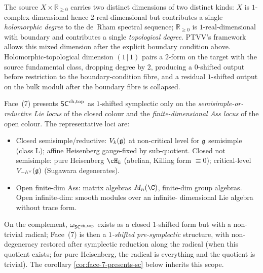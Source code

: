 \begin{remark}
\label{rem:why-pair-21}%
The source $X\times\mathbb{R}_{\geq 0}$ carries two distinct
dimensions of two distinct kinds:
$X$ is $1$-complex-dimensional hence $2$-real-dimensional but
contributes a single \emph{holomorphic degree} to the de~Rham
spectral sequence; $\mathbb{R}_{\geq 0}$ is $1$-real-dimensional
with boundary and contributes a single \emph{topological degree}.
PTVV's framework allows this mixed dimension after the explicit
boundary condition above. Holomorphic-topological dimension
$(1\,|\,1)$ pairs a $2$-form on the target with the source
fundamental class, dropping degree by $2$, producing a
$0$-shifted output before restriction to the boundary-condition
fibre, and a residual $1$-shifted output on the bulk moduli after
the boundary fibre is collapsed.
\end{remark}

\begin{remark}
\label{rem:face-7-scope}%
%
Face~(7) presents $\mathsf{SC}^{\mathrm{ch},\mathrm{top}}$ as $1$-shifted symplectic only on the
\emph{semisimple-or-reductive Lie locus} of the closed colour and
the \emph{finite-dimensional Ass locus} of the open colour. The
representative loci are:
\begin{itemize}
\item Closed semisimple/reductive: $V_k(\mathfrak{g})$ at non-critical level
for $\mathfrak{g}$ semisimple (class L); affine Heisenberg gauge-fixed by
sub-quotient. Closed not semisimple: pure Heisenberg
$\cH_k$ (abelian, Killing form $\equiv 0$); critical-level
$V_{-h^\vee}(\mathfrak{g})$ (Sugawara degenerates).
\item Open finite-dim Ass: matrix algebras $M_n(\C)$, finite-dim
group algebras. Open infinite-dim: smooth modules over an infinite-
dimensional Lie algebra without trace form.
\end{itemize}
On the complement, $\omega_{\mathsf{SC}^{\mathrm{ch},\mathrm{top}}}$ exists as a closed
$1$-shifted form but with a non-trivial radical; Face~(7) is then a
\emph{$1$-shifted pre-symplectic} structure, with non-degeneracy
restored after symplectic reduction along the radical (when this
quotient exists; for pure Heisenberg, the radical is everything and
the quotient is trivial). The corollary
\ref{cor:face-7-presents-sc} below inherits this scope.
\end{remark}

